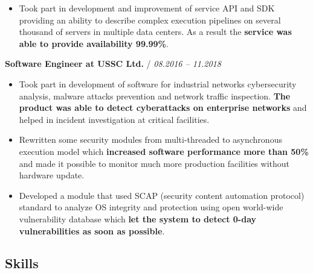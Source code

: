 \documentclass[a4paper,10pt]{article}
\newcommand{\notice}[1]{{\textcolor{dark}{\textbf{#1}}}}
\newcommand{\info}[1]{{\textcolor{darkdark}{\textbf{#1}}}}
\begin{document}
\begin{adjustwidth}{10pt}{10pt}
\begin{itemize}
        \item Took part in development and improvement of service API and SDK providing an ability to describe complex execution pipelines on several thousand of servers in multiple data centers. As a result the \info{service was able to provide availability 99.99\%}.

        \end{itemize}


        \notice{Software Engineer at USSC Ltd.} / \textit{08.2016 – 11.2018}

        \begin{itemize}

        \item Took part in development of software for industrial networks cybersecurity analysis, malware attacks prevention and network traffic inspection. \info{The product was able to detect cyberattacks on enterprise networks} and helped in incident investigation at critical facilities.

        \item Rewritten some security modules from multi-threaded to asynchronous execution model which \info{increased software performance more than 50\%} and made it possible to monitor much more production facilities without hardware update.

        \item Developed a module that used SCAP (security content automation protocol) standard to analyze OS integrity and protection using open world-wide vulnerability database which \info{let the system to detect 0-day vulnerabilities as soon as possible}.

        \end{itemize}

    \end{adjustwidth}

\subsection*{Skills}
\end{document}
